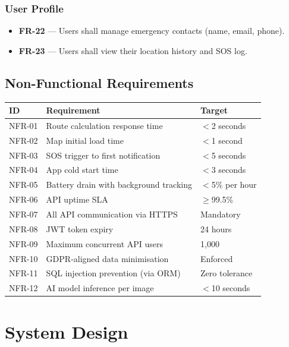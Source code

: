 \documentclass[12pt,a4paper]{report}
\begin{document}
\subsection{User Profile}
\begin{itemize}[leftmargin=*]
    \item \textbf{FR-22} — Users shall manage emergency contacts (name, email, phone).
    \item \textbf{FR-23} — Users shall view their location history and SOS log.
\end{itemize}

\section{Non-Functional Requirements}

\begin{longtable}{@{}lp{9cm}l@{}}
\toprule
\textbf{ID} & \textbf{Requirement} & \textbf{Target} \\
\midrule
\endhead
NFR-01 & Route calculation response time & $<$2 seconds \\
NFR-02 & Map initial load time & $<$1 second \\
NFR-03 & SOS trigger to first notification & $<$5 seconds \\
NFR-04 & App cold start time & $<$3 seconds \\
NFR-05 & Battery drain with background tracking & $<$5\% per hour \\
NFR-06 & API uptime SLA & $\geq$99.5\% \\
NFR-07 & All API communication via HTTPS & Mandatory \\
NFR-08 & JWT token expiry & 24 hours \\
NFR-09 & Maximum concurrent API users & 1,000 \\
NFR-10 & GDPR-aligned data minimisation & Enforced \\
NFR-11 & SQL injection prevention (via ORM) & Zero tolerance \\
NFR-12 & AI model inference per image & $<$10 seconds \\
\bottomrule
\end{longtable}

\chapter{System Design}
\end{document}
